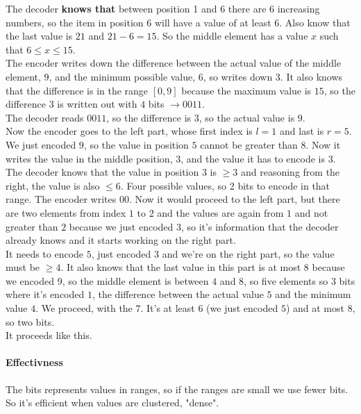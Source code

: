 \documentclass[10pt]{report}
\begin{document}
The decoder \textbf{knows that} between position 1 and 6 there are 6 increasing numbers, so the item in position 6 will have a value of at least $6$. Also know that the last value is $21$ and $21-6 = 15$. So the middle element has a value $x$ such that $6\leq x \leq 15$.\\
The encoder writes down the difference between the actual value of the middle element, $9$, and the minimum possible value, $6$, so writes down $3$. It also knows that the difference is in the range $[0,9]$ because the maximum value is $15$, so the difference $3$ is written out with $4$ bits $\rightarrow 0011$.\\
The decoder reads $0011$, so the difference is $3$, so the actual value is $9$.\\
Now the encoder goes to the left part, whose first index is $l=1$ and last is $r=5$. We just encoded $9$, so the value in position $5$ cannot be greater than $8$. Now it writes the value in the middle position, $3$, and the value it has to encode is $3$.\\
The decoder knows that the value in position $3$ is $\geq 3$ and reasoning from the right, the value is also $\leq 6$. Four possible values, so 2 bits to encode in that range. The encoder writes $00$. Now it would proceed to the left part, but there are two elements from index $1$ to $2$ and the values are again from $1$ and not greater than $2$ because we just encoded $3$, so it's information that the decoder already knows and it starts working on the right part.\\
It needs to encode $5$, just encoded $3$ and we're on the right part, so the value must be $\geq 4$. It also knows that the last value in this part is at most $8$ because we encoded $9$, so the middle element is between $4$ and $8$, so five elements so $3$ bits where it's encoded $1$, the difference between the actual value $5$ and the minimum value $4$. We proceed, with the $7$. It's at least $6$ (we just encoded $5$) and at most $8$, so two bits.\\
It proceeds like this.
\paragraph{Effectivness} The bits represents values in ranges, so if the ranges are small we use fewer bits. So it's efficient when values are clustered, "dense".
\end{document}
